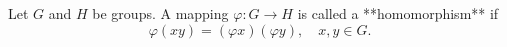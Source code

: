 Let $G$ and $H$ be groups. A mapping $\varphi: G \to H$ is called a **homomorphism** if
$$\varphi(xy) = (\varphi x)(\varphi y), \quad x, y \in G.$$
